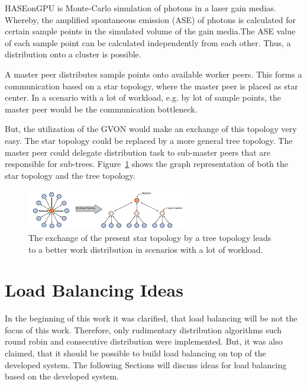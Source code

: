 HASEonGPU is Monte-Carlo simulation of photons in a laser gain
medias. Whereby, the amplified spontaneous emission (ASE) of photons
is calculated for certain sample points in the simulated volume of
the gain media.The ASE value of each sample point can be calculated
independently from each other. Thus, a distribution onto a cluster
is possible.

A master peer distributes sample points onto
available worker peers. This forms a communication based on a
star topology, where the master peer is placed as star center. In a
scenario with a lot of workload, e.g. by lot of sample points, the
master peer would be the communication bottleneck.

But, the utilization of the GVON would make an exchange of this
topology very easy. The star topology could be replaced by a more
general tree topology. The master peer could delegate distribution
task to sub-master peers that are responsible for sub-trees.
Figure~\ref{fig:haseongpu_topology} shows the graph representation of
both the star topology and the tree topology.

\begin{figure}[H]
  \centering \includegraphics[width=\textwidth]{graphics/60_haseongpu_topology}
  \caption{The exchange of the present star topology by a tree topology
  leads to a better work distribution in scenarios with a lot of workload.}
  \label{fig:haseongpu_topology}
\end{figure}

\section*{Load Balancing Ideas}

In the beginning of this work it was clarified, that load balancing
will be not the focus of this work. Therefore, only rudimentary
distribution algorithms such round robin and consecutive distribution
were implemented. But, it was also claimed, that it should be possible
to build load balancing on top of the developed system.  The following
Sections will discuss ideas for load balancing based on the developed
system.


